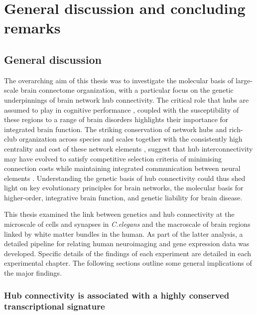 \chapter{General discussion and concluding \\ remarks}
\label{ch:Discussion}

\section{General discussion}
The overarching aim of this thesis was to investigate the molecular basis of large-scale brain connectome organization, with a particular focus on the genetic underpinnings of brain network hub connectivity. The critical role that hubs are assumed to play in cognitive performance \citep{Buckner2009,Mesulam1998}, coupled with the susceptibility of these regions to a range of brain disorders \citep{Bassett2009a,Crossley2014,Fornito2015} highlights their importance for integrated brain function. The striking conservation of network hubs and rich-club organization across species and scales together with the consistently high centrality and cost of these network elements \citep{VandenHeuvel2016}, suggest that hub interconnectivity may have evolved to satisfy competitive selection criteria of minimising connection costs while maintaining integrated communication between neural elements \citep{Bullmore2012}. Understanding the genetic basis of hub connectivity could thus shed light on key evolutionary principles for brain networks, the molecular basis for higher-order, integrative brain function, and genetic liability for brain disease.

This thesis examined the link between genetics and hub connectivity at the microscale of cells and synapses in \textit{C.elegans} and the macroscale of brain regions linked by white matter bundles in the human. As part of the latter analysis, a detailed pipeline for relating human neuroimaging and gene expression data was developed. Specific details of the findings of each experiment are detailed in each experimental chapter. The following sections outline some general implications of the major findings.

\subsection*{Hub connectivity is associated with a highly conserved transcriptional signature}


